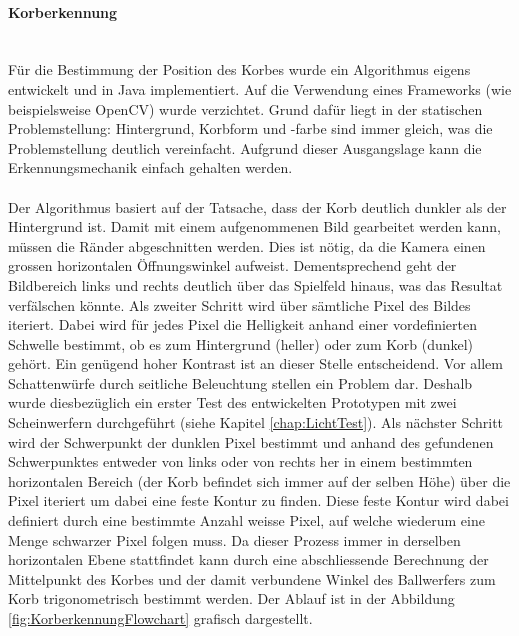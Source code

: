 	\paragraph{Korberkennung}$~~$\vspace{2mm}\\
		Für die Bestimmung der Position des Korbes wurde ein Algorithmus 
		eigens entwickelt und in Java implementiert. Auf die Verwendung eines 
		Frameworks (wie beispielsweise OpenCV) wurde verzichtet. Grund dafür 
		liegt in der statischen Problemstellung: Hintergrund, Korbform und -farbe 
		sind immer gleich, was die Problemstellung deutlich vereinfacht. Aufgrund 
		dieser Ausgangslage kann die Erkennungsmechanik einfach gehalten werden. \\
		\\
		Der Algorithmus 
		basiert auf der Tatsache, dass der Korb deutlich dunkler als der 
		Hintergrund ist. Damit mit einem aufgenommenen Bild gearbeitet werden kann, 
		müssen die Ränder abgeschnitten werden. Dies ist nötig, da die Kamera einen 
		grossen horizontalen Öffnungswinkel aufweist. Dementsprechend geht der 
		Bildbereich links und rechts deutlich über das Spielfeld 
		hinaus, was das Resultat verfälschen könnte. Als zweiter Schritt wird 
		über sämtliche Pixel des Bildes iteriert. Dabei wird für jedes Pixel die 
		Helligkeit anhand einer vordefinierten Schwelle bestimmt, ob es zum 
		Hintergrund (heller) oder zum Korb (dunkel) gehört. Ein genügend hoher 
		Kontrast ist an dieser Stelle entscheidend. Vor allem Schattenwürfe durch 
		seitliche Beleuchtung stellen ein Problem dar. Deshalb wurde diesbezüglich 
		ein erster Test des entwickelten Prototypen mit zwei Scheinwerfern 
		durchgeführt (siehe Kapitel \ref{chap:LichtTest}). Als nächster Schritt 
		wird der Schwerpunkt der dunklen Pixel bestimmt und anhand des gefundenen 
		Schwerpunktes entweder von links oder von rechts her in einem bestimmten 
		horizontalen Bereich (der Korb befindet sich immer auf der selben Höhe)
		über die Pixel iteriert um dabei eine feste Kontur zu finden. Diese feste 
		Kontur wird dabei definiert durch eine bestimmte Anzahl weisse Pixel, auf 
		welche wiederum eine Menge schwarzer Pixel folgen muss. Da dieser Prozess 
		immer in derselben horizontalen Ebene stattfindet kann durch eine 
		abschliessende Berechnung der Mittelpunkt des Korbes und der damit 
		verbundene Winkel des Ballwerfers zum Korb trigonometrisch bestimmt werden.
		Der Ablauf ist in der Abbildung \ref{fig:KorberkennungFlowchart} grafisch 
		dargestellt.
